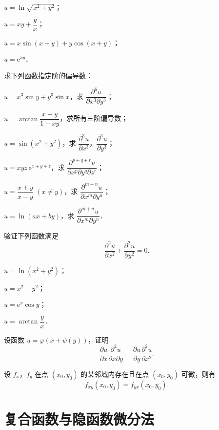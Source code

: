\begin{xiti}
\begin{ziti}
\item $u=\ln\sqrt{x^{2}+y^{2}}$；
\item $u=xy+\dfrac{y}{x}$；
\item $u=x\sin(x+y)+y\cos(x+y)$；
\item $u=\mathrm{e}^{xy}$．
\end{ziti}
\item 求下列函数指定阶的偏导数：
\begin{ziti}
\item $u=x^{3}\sin y+y^{3}\sin x$，求 $\dfrac{\partial^{6}u}{\partial x^{3}\partial y^{3}}$；
\item $u=\arctan\dfrac{x+y}{1-xy}$，求所有三阶偏导数；
\item $u=\sin(x^{2}+y^{2})$，求 $\dfrac{\partial^{3}u}{\partial x^{3}}$，$\dfrac{\partial^{3}u}{\partial y^{3}}$；
\item $u=xyz\,\mathrm{e}^{x+y+z}$，求 $\dfrac{\partial^{p+q+r}u}{\partial x^{p}\partial y^{q}\partial z^{r}}$；
\item $u=\dfrac{x+y}{x-y}$ $(x\neq y)$，求 $\dfrac{\partial^{m+n}u}{\partial x^{m}\partial y^{n}}$；
\item $u=\ln(ax+by)$，求 $\dfrac{\partial^{m+n}u}{\partial x^{m}\partial y^{n}}$．
\end{ziti}
\item 验证下列函数满足
\[
\frac{\partial^{2}u}{\partial x^{2}}+\frac{\partial^{2}u}{\partial y^{2}}=0.
\]
\begin{ziti}
\item $u=\ln(x^{2}+y^{2})$；
\item $u=x^{2}-y^{2}$；
\item $u=\mathrm{e}^{x}\cos y$；
\item $u=\arctan\dfrac{y}{x}$．
\end{ziti}
\item 设函数 $u=\varphi(x+\psi(y))$，证明
\[
\frac{\partial u}{\partial x}\frac{\partial^{2}u}{\partial x\partial y}=\frac{\partial u}{\partial y}\frac{\partial^{2}u}{\partial x^{2}}.
\]
\item 设 $f_{x}$，$f_{y}$ 在点 $(x_{0},y_{0})$ 的某邻域内存在且在点 $(x_{0},y_{0})$ 可微，则有
\[
f_{xy}(x_{0},y_{0})=f_{yx}(x_{0},y_{0}).
\]
\end{xiti}

\section{复合函数与隐函数微分法}

